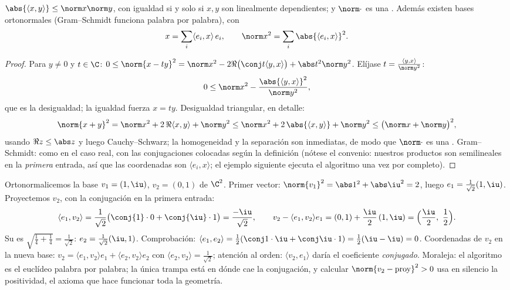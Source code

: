 \begin{theorem}\label{thm:b2:hermitian:cs}
$\abs{\langle x, y\rangle} \leq \norm x \norm y$, con igualdad si y
solo si $x, y$ son linealmente dependientes; y $\norm\cdot$ es una
. Además existen bases ortonormales (Gram--Schmidt funciona
palabra por palabra), con
\[
x = \sum_i \langle e_i, x\rangle\, e_i,
\qquad
\norm x^2 = \sum_i \abs{\langle e_i, x\rangle}^2 .
\]
\end{theorem}

\begin{proof}
Para $y \neq 0$ y $t \in \C$: $0 \leq \norm{x - ty}^2 = \norm x^2 -
2\Re\bigl(\conj t\langle y, x\rangle\bigr) + \abs t^2\norm y^2$.
Elíjase $t = \frac{\langle y, x\rangle}{\norm y^2}$:
\[
0 \leq \norm x^2 - \frac{\abs{\langle y, x\rangle}^2}{\norm y^2},
\]
que es la desigualdad; la igualdad fuerza $x = ty$. Desigualdad
triangular, en detalle:
\[
\norm{x + y}^2 = \norm x^2 + 2\,\Re\langle x, y\rangle
+ \norm y^2
\leq \norm x^2 + 2\,\abs{\langle x, y\rangle} + \norm y^2
\leq \bigl(\norm x + \norm y\bigr)^2 ,
\]
usando $\Re z \leq \abs z$ y luego Cauchy--Schwarz; la homogeneidad y
la separación son inmediatas, de modo que $\norm\cdot$ es una
. Gram--Schmidt: como en el caso real, con las conjugaciones
colocadas según la definición (nótese el convenio: nuestros productos
son semilineales en la \emph{primera} entrada, así que las
coordenadas son $\langle e_i, x\rangle$; el ejemplo siguiente ejecuta
el algoritmo una vez por completo).
\end{proof}

\begin{example}\label{ex:b2:hermitian:gramschmidt}
Ortonormalicemos la base $v_1 = (1, \iu)$, $v_2 = (0, 1)$ de $\C^2$.
Primer vector: $\norm{v_1}^2 = \abs1^2 + \abs\iu^2 = 2$, luego $e_1 =
\frac{1}{\sqrt2}(1, \iu)$. Proyectemos $v_2$, con la conjugación en
la primera entrada:
\[
\langle e_1, v_2\rangle
= \frac{1}{\sqrt2}\bigl(\conj{1}\cdot0 +
\conj{\iu}\cdot1\bigr)
= \frac{-\iu}{\sqrt2} ,
\qquad
v_2 - \langle e_1, v_2\rangle e_1
= (0,1) + \frac{\iu}{2}\,(1, \iu)
= \Bigl(\frac\iu2,\ \frac12\Bigr) .
\]
Su  es $\sqrt{\frac14 + \frac14} = \frac{1}{\sqrt2}$: $e_2 =
\frac{1}{\sqrt2}(\iu, 1)$. Comprobación: $\langle e_1, e_2\rangle =
\frac12(\conj1\cdot\iu + \conj\iu\cdot1) = \frac12(\iu - \iu) = 0$.
Coordenadas de $v_2$ en la nueva base: $v_2 = \langle e_1,
v_2\rangle e_1 + \langle e_2, v_2\rangle e_2$ con $\langle e_2,
v_2\rangle = \frac{1}{\sqrt2}$; atención al orden: $\langle v_2,
e_1\rangle$ daría el coeficiente \emph{conjugado}. Moraleja: el
algoritmo es el euclídeo palabra por palabra; la única trampa está en
dónde cae la conjugación, y calcular $\norm{v_2 - \text{proy}}^2 > 0$
usa en silencio la positividad, el axioma que hace funcionar toda la
geometría.
\end{example}

